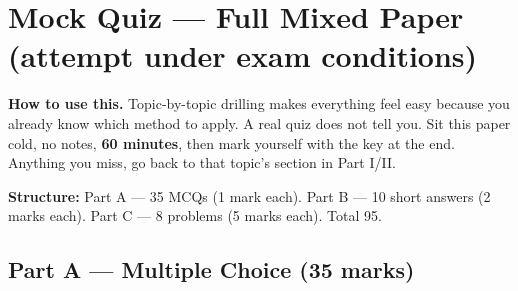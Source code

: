 \section{Mock Quiz --- Full Mixed Paper (attempt under exam conditions)}

\begin{keypoint}
\textbf{How to use this.} Topic-by-topic drilling makes everything feel easy because you already know which method to apply. A real quiz does not tell you. Sit this paper cold, no notes, \textbf{60 minutes}, then mark yourself with the key at the end. Anything you miss, go back to that topic's section in Part I/II.

\textbf{Structure:} Part A --- 35 MCQs (1 mark each). Part B --- 10 short answers (2 marks each). Part C --- 8 problems (5 marks each). Total 95.
\end{keypoint}

\subsection{Part A --- Multiple Choice (35 marks)}


